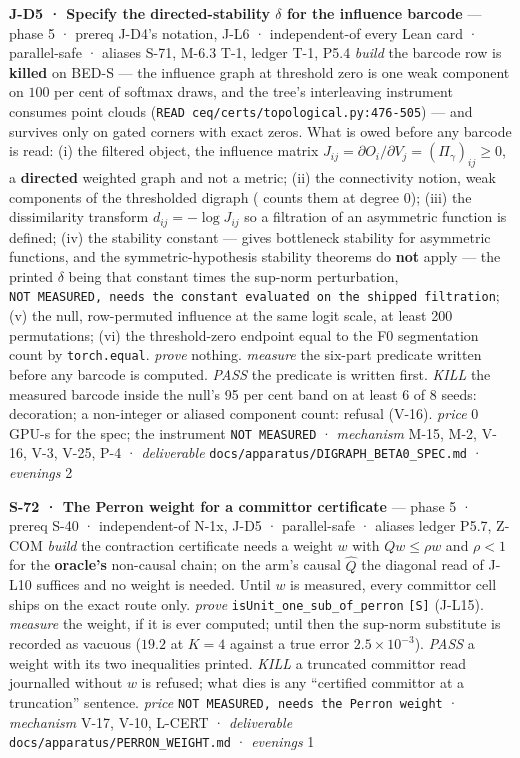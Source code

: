 \documentclass[11pt,a4paper]{article}
\theoremstyle{plain}
\theoremstyle{definition}
\theoremstyle{remark}
\begin{document}
\textbf{J-D5 · Specify the directed-stability \(\delta\) for the
influence barcode} --- phase 5 · prereq J-D4's notation, J-L6 ·
independent-of every Lean card · parallel-safe · aliases S-71, M-6.3
T-1, ledger T-1, P5.4 \emph{build} the barcode row is \textbf{killed} on
BED-S --- the influence graph at threshold zero is one weak component on
\(100\) per cent of softmax draws, and the tree's interleaving
instrument consumes point clouds
(\texttt{READ\ ceq/certs/topological.py:476-505}) --- and survives only
on gated corners with exact zeros. What is owed before any barcode is
read: (i) the filtered object, the influence matrix
\(J_{ij}=\partial O_i/\partial V_j=(\Pi_\gamma)_{ij}\ge0\), a
\textbf{directed} weighted graph and not a metric; (ii) the connectivity
notion, weak components of the thresholded digraph
(\citep{chowdhury-2017-path-homology} counts them at degree 0); (iii)
the dissimilarity transform \(d_{ij}=-\log J_{ij}\) so a filtration of
an asymmetric function is defined; (iv) the stability constant ---
\citep{turner-2019-quasimetric-rips} gives bottleneck stability for
asymmetric functions, and the symmetric-hypothesis stability theorems do
\textbf{not} apply --- the printed \(\delta\) being that constant times
the sup-norm perturbation,
\texttt{NOT\ MEASURED,\ needs\ the\ constant\ evaluated\ on\ the\ shipped\ filtration};
(v) the null, row-permuted influence at the same logit scale, at least
200 permutations; (vi) the threshold-zero endpoint equal to the F0
segmentation count by \texttt{torch.equal}. \emph{prove} nothing.
\emph{measure} the six-part predicate written before any barcode is
computed. \emph{PASS} the predicate is written first. \emph{KILL} the
measured barcode inside the null's 95 per cent band on at least 6 of 8
seeds: decoration; a non-integer or aliased component count: refusal
(V-16). \emph{price} \(0\) GPU-s for the spec; the instrument
\texttt{NOT\ MEASURED} · \emph{mechanism} M-15, M-2, V-16, V-3, V-25,
P-4 · \emph{deliverable} \texttt{docs/apparatus/DIGRAPH\_BETA0\_SPEC.md}
· \emph{evenings} 2

\textbf{S-72 · The Perron weight for a committor certificate} --- phase
5 · prereq S-40 · independent-of N-1x, J-D5 · parallel-safe · aliases
ledger P5.7, Z-COM \emph{build} the contraction certificate needs a
weight \(w\) with \(Qw\le\rho w\) and \(\rho<1\) for the
\textbf{oracle's} non-causal chain; on the arm's causal \(\hat Q\) the
diagonal read of J-L10 suffices and no weight is needed. Until \(w\) is
measured, every committor cell ships on the exact route only.
\emph{prove} \texttt{isUnit\_one\_sub\_of\_perron} \texttt{{[}S{]}}
(J-L15). \emph{measure} the weight, if it is ever computed; until then
the sup-norm substitute is recorded as vacuous (\(19.2\) at \(K=4\)
against a true error \(2.5\times10^{-3}\)). \emph{PASS} a weight with
its two inequalities printed. \emph{KILL} a truncated committor read
journalled without \(w\) is refused; what dies is any ``certified
committor at a truncation'' sentence. \emph{price}
\texttt{NOT\ MEASURED,\ needs\ the\ Perron\ weight} · \emph{mechanism}
V-17, V-10, L-CERT · \emph{deliverable}
\texttt{docs/apparatus/PERRON\_WEIGHT.md} · \emph{evenings} 1
\end{document}
